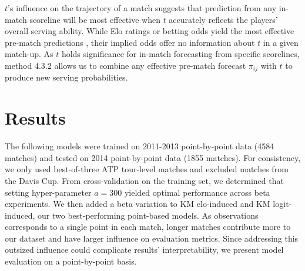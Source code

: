 \documentclass[chapterprefix=false]{report}
\begin{document}
$t$'s influence on the trajectory of a match suggests that prediction from any in-match scoreline will be most effective when $t$ accurately reflects the players' overall serving ability. While Elo ratings or betting odds yield the most effective pre-match predictions \citep{Kovalchik2016}, their implied odds offer no information about $t$ in a given match-up. As $t$ holds significance for in-match forecasting from specific scorelines, method 4.3.2 allows us to combine any effective pre-match forecast $\pi_{ij}$ with $t$ to produce new serving probabilities.








\section{Results}

The following models were trained on 2011-2013 point-by-point data (4584 matches) and tested on 2014 point-by-point data (1855 matches). For consistency, we only used best-of-three ATP tour-level matches and excluded matches from the Davis Cup. From cross-validation on the training set, we determined that setting hyper-parameter $a=300$ yielded optimal performance across beta experiments. We then added a beta variation to KM elo-induced and KM logit-induced, our two best-performing point-based models. As observations corresponds to a single point in each match, longer matches contribute more to our dataset and have larger influence on evaluation metrics. Since addressing this outsized influence could complicate results' interpretability, we present model evaluation on a point-by-point basis.
\end{document}
